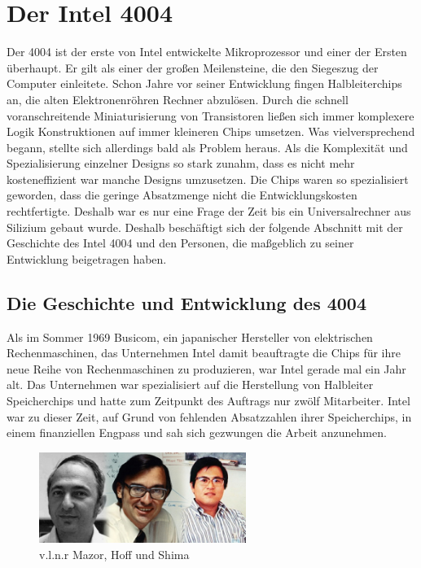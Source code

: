 \newpage
\section{Der Intel 4004}

Der 4004 ist der erste von Intel entwickelte Mikroprozessor und einer der Ersten überhaupt. Er gilt als einer der großen Meilensteine, die den Siegeszug der Computer einleitete. Schon Jahre vor seiner Entwicklung fingen Halbleiterchips an, die alten Elektronenröhren Rechner abzulösen. Durch die schnell voranschreitende Miniaturisierung von Transistoren ließen sich immer komplexere Logik Konstruktionen auf immer kleineren Chips umsetzen. Was vielversprechend begann, stellte sich allerdings bald als Problem heraus. Als die Komplexität und Spezialisierung einzelner Designs so stark zunahm, dass es nicht mehr kosteneffizient war manche Designs umzusetzen. Die Chips waren so spezialisiert geworden, dass die geringe Absatzmenge nicht die Entwicklungskosten rechtfertigte. Deshalb war es nur eine Frage der Zeit bis ein Universalrechner aus Silizium gebaut wurde. Deshalb beschäftigt sich der folgende Abschnitt mit der Geschichte des Intel 4004 und den Personen, die maßgeblich zu seiner Entwicklung beigetragen haben.
 
\subsection{Die Geschichte und Entwicklung des 4004}

Als im Sommer 1969 Busicom, ein japanischer Hersteller von elektrischen Rechenmaschinen, das Unternehmen Intel damit beauftragte die Chips für ihre neue Reihe von Rechenmaschinen zu produzieren, war Intel gerade mal ein Jahr alt. Das Unternehmen war spezialisiert auf die Herstellung von Halbleiter Speicherchips und hatte zum Zeitpunkt des Auftrags nur zwölf Mitarbeiter. Intel war zu dieser Zeit, auf Grund von fehlenden Absatzzahlen ihrer Speicherchips, in einem finanziellen Engpass und sah sich gezwungen die Arbeit anzunehmen.
\vspace{-24pt}
\begin{figure}
	\vspace{20pt}
	\includegraphics[width=0.6\textwidth]{figures/creators1.jpeg}
	\caption{v.l.n.r Mazor, Hoff und Shima}
	\label{fig:creators1}
	\vspace{-20pt}
\end{figure}

